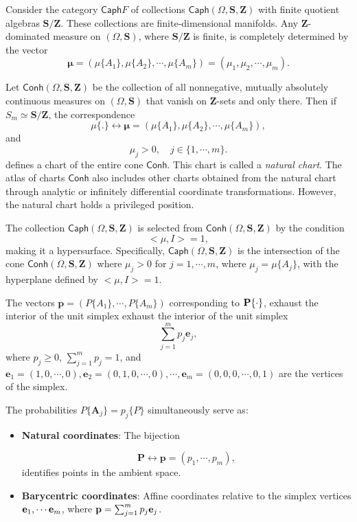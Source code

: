Consider the category $\mathsf{Caph}F$ of collections $\mathsf{\mathsf{Caph}}(\Omega,\mathbf{S},\mathbf{Z})$ with finite quotient algebras $\mathbf{S}/ \mathbf{Z}$. These collections are finite-dimensional manifolds. 
Any $\mathbf{Z}$-dominated measure on $(\Omega, \mathbf{S})$, where $\mathbf{S}/ \mathbf{Z}$ is finite, is completely determined by the vector
\[\boldsymbol{\mu}=(\mu\{A_1\},\mu\{A_2\},\cdots,\mu\{A_m\})=(\mu_1,\mu_2,\cdots,\mu_m).\]

\begin{definition}
Let $\mathsf{\mathsf{Conh}}(\Omega,\mathbf{S},\mathbf{Z})$ be the collection of all nonnegative, mutually absolutely continuous measures on $(\Omega,\mathbf{S})$ that vanish on $\mathbf{Z}$-sets and only there. Then if $S_m \simeq \mathbf{S}/\mathbf{Z}$, the correspondence
\[
\mu \{.\}  \longleftrightarrow \boldsymbol{\mu} = (\mu\{A_1\},\mu\{A_2\},\cdots,\mu\{A_m\}),
\]
and
\[
\mu_j > 0,\quad j\in\{1,\cdots,m\}.
\]
defines a chart of the entire cone $\mathsf{\mathsf{Conh}}$. This chart is called a \emph{natural chart}.
The atlas of charts ${\mathsf{Conh}}$ also includes other charts obtained from the natural chart through analytic or infinitely differential coordinate transformations. However, the natural chart holds a privileged position.
\end{definition}
\begin{proposition}
   The collection $\mathsf{Caph}(\Omega,\mathbf{S},\mathbf{Z})$ is selected from $\mathsf{Conh}(\Omega,\mathbf{S},\mathbf{Z})$
by the condition
\[
<\mu,I>=1,
\]
making it a hypersurface. Specifically, $\mathsf{Caph}(\Omega, \mathbf{S}, \mathbf{Z})$ is the intersection of the cone  $\mathsf{Conh}(\Omega,\mathbf{S},\mathbf{Z})$ where
$\mu_j > 0$ for $j=1,\cdots,m$, where $\mu_j= \mu\{A_j\}$, with the hyperplane defined by $<\mu,I>=1$.

The vectors $\mathbf{p}=(P\{A_1\},\cdots,P\{A_m\})$ corresponding to ${\bf P\{\cdot\}}$, exhaust the interior of the unit simplex 
exhaust the interior of the unit simplex
\[
\sum_{j=1}^m p_j\mathbf{e}_j, 
\]
where $p_j\geq 0$, $\sum_{j=1}^m p_j=1$, and  $\mathbf{e}_1=(1,0,\cdots,0),\mathbf{e}_2=(0,1,0,\cdots,0),\cdots, \mathbf{e}_m = (0,0,0,\cdots,0,1)$ are the vertices of the simplex.
\end{proposition}
\begin{definition}
The probabilities $P\{\mathbf{A}_j\}=p_j\{P\}$ simultaneously serve as:

\begin{itemize}
    \item {\bf Natural coordinates}: The bijection

\[
\mathbf{P} \longleftrightarrow \mathbf{p}=(p_1,\cdots,p_m),
\] identifies points in the ambient space.
     \item {\bf Barycentric coordinates}: Affine coordinates relative to the simplex vertices ${\bf e}_1,\cdots {\bf e}_m$, where 
     $\mathbf{p}=\sum_{j=1}^mp_j{\bf e}_j$.
\end{itemize}
\end{definition}
